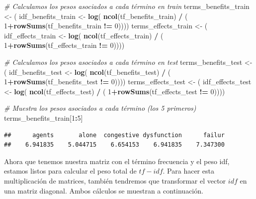 \documentclass[spanish,]{article}
\newenvironment{Shaded}{\begin{snugshade}}{\end{snugshade}}
\newcommand{\KeywordTok}[1]{\textcolor[rgb]{0.13,0.29,0.53}{\textbf{#1}}}
\newcommand{\DecValTok}[1]{\textcolor[rgb]{0.00,0.00,0.81}{#1}}
\newcommand{\StringTok}[1]{\textcolor[rgb]{0.31,0.60,0.02}{#1}}
\newcommand{\CommentTok}[1]{\textcolor[rgb]{0.56,0.35,0.01}{\textit{#1}}}
\newcommand{\OperatorTok}[1]{\textcolor[rgb]{0.81,0.36,0.00}{\textbf{#1}}}
\newcommand{\NormalTok}[1]{#1}
\begin{document}
\begin{Shaded}
\begin{Highlighting}[]
\CommentTok{# Calculamos los pesos asociados a cada término en train}
\NormalTok{terms_benefits_train <-}\StringTok{ }\NormalTok{( idf_benefits_train <-}\StringTok{ }\KeywordTok{log}\NormalTok{( }\KeywordTok{ncol}\NormalTok{(tf_benefits_train) }
                                                \OperatorTok{/}\StringTok{ }\NormalTok{( }\DecValTok{1}\OperatorTok{+}\KeywordTok{rowSums}\NormalTok{(tf_benefits_train }\OperatorTok{!=}\StringTok{ }\DecValTok{0}\NormalTok{))))}
\NormalTok{terms_effects_train <-}\StringTok{ }\NormalTok{( idf_effects_train <-}\StringTok{ }\KeywordTok{log}\NormalTok{( }\KeywordTok{ncol}\NormalTok{(tf_effects_train) }
                                                \OperatorTok{/}\StringTok{ }\NormalTok{( }\DecValTok{1}\OperatorTok{+}\KeywordTok{rowSums}\NormalTok{(tf_effects_train }\OperatorTok{!=}\StringTok{ }\DecValTok{0}\NormalTok{))))}

\CommentTok{# Calculamos los pesos asociados a cada término en test}
\NormalTok{terms_benefits_test <-}\StringTok{ }\NormalTok{( idf_benefits_test <-}\StringTok{ }\KeywordTok{log}\NormalTok{( }\KeywordTok{ncol}\NormalTok{(tf_benefits_test) }
                                                \OperatorTok{/}\StringTok{ }\NormalTok{( }\DecValTok{1}\OperatorTok{+}\KeywordTok{rowSums}\NormalTok{(tf_benefits_test }\OperatorTok{!=}\StringTok{ }\DecValTok{0}\NormalTok{))))}
\NormalTok{terms_effects_test <-}\StringTok{ }\NormalTok{( idf_effects_test <-}\StringTok{ }\KeywordTok{log}\NormalTok{( }\KeywordTok{ncol}\NormalTok{(tf_effects_test) }
                                               \OperatorTok{/}\StringTok{ }\NormalTok{( }\DecValTok{1}\OperatorTok{+}\KeywordTok{rowSums}\NormalTok{(tf_effects_test }\OperatorTok{!=}\StringTok{ }\DecValTok{0}\NormalTok{))))}

\CommentTok{# Muestra los pesos asociados a cada término (los 5 primeros)}
\NormalTok{terms_benefits_train[}\DecValTok{1}\OperatorTok{:}\DecValTok{5}\NormalTok{] }
\end{Highlighting}
\end{Shaded}

\begin{verbatim}
##      agents       alone  congestive dysfunction      failur 
##    6.941835    5.044715    6.654153    6.941835    7.347300
\end{verbatim}

Ahora que tenemos nuestra matriz con el término frecuencia y el peso
idf, estamos listos para calcular el peso total de \(tf-idf\). Para
hacer esta multiplicación de matrices, también tendremos que transformar
el vector \(idf\) en una matriz diagonal. Ambos cálculos se muestran a
continuación.
\end{document}
